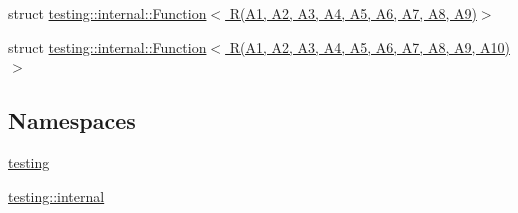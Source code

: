 \begin{DoxyCompactItemize}
\item 
struct \hyperlink{structtesting_1_1internal_1_1_function_3_01_r_07_a1_00_01_a2_00_01_a3_00_01_a4_00_01_a5_00_01_a6dfab3ccde80824a59fc4efd5336a27c1}{testing\+::internal\+::\+Function$<$ R(\+A1, A2, A3, A4, A5, A6, A7, A8, A9)$>$}
\item 
struct \hyperlink{structtesting_1_1internal_1_1_function_3_01_r_07_a1_00_01_a2_00_01_a3_00_01_a4_00_01_a5_00_01_a6f6ff91550f0557b7708e490e5002cd35}{testing\+::internal\+::\+Function$<$ R(\+A1, A2, A3, A4, A5, A6, A7, A8, A9, A10)$>$}
\end{DoxyCompactItemize}
\subsection*{Namespaces}
\begin{DoxyCompactItemize}
\item 
 \hyperlink{namespacetesting}{testing}
\item 
 \hyperlink{namespacetesting_1_1internal}{testing\+::internal}
\end{DoxyCompactItemize}

